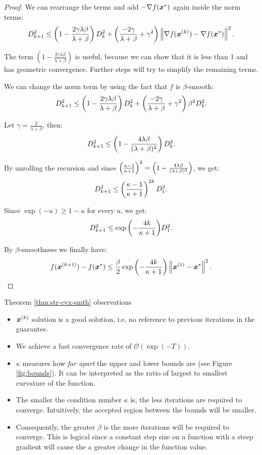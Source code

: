 \documentclass{article}
\begin{document}
{\begin{proof}
We can rearrange the terms and add $-\nabla f({\bm{x}}^\ast)$ again inside the norm terms:
\[
    D_{k+1}^2 \leq \left(1 - \frac{2\gamma \lambda \beta}{\lambda + \beta}\right) D^2_k + \left(\frac{-2\gamma}{\lambda + \beta} + \gamma^2\right) \left\|\nabla f({\bm{x}}^{(k)}) - \nabla f({\bm{x}}^\ast)\right\|^2.
\]

The term $\left(1-\frac{2\gamma \lambda \beta}{\lambda + \beta}\right)$ is useful, because we can show that it is less than 1 and has geometric convergence. Further steps will try to simplify the remaining terms.

We can change the norm term by using the fact that $f$ is $\beta$-smooth:
\[
    D_{k+1}^2 \leq \left(1 - \frac{2\gamma \lambda \beta}{\lambda + \beta}\right) D^2_k + \left(\frac{-2\gamma}{\lambda + \beta} + \gamma^2\right) \beta^2 D^2_k.
\]

Let $\gamma = \frac{2}{\lambda + \beta}$, then:
\[
    D^2_{k+1} \leq \left(1 - \frac{4 \lambda \beta}{(\lambda + \beta)^2}\right) D^2_k.
\]

By unrolling the recursion and since $\left(\frac{\kappa - 1}{\kappa + 1}\right)^2 = \left(1 - \frac{4 \lambda \beta}{(\lambda + \beta)^2}\right)$, we get:
\[
    D^2_{k+1} \leq \left(\frac{\kappa - 1}{\kappa + 1}\right)^{2k} D_1^2.
\]

Since $\exp(-u) \geq 1-u$ for every $u$, we get:
\[
    D_{k+1}^2 \leq \exp{\left(-\frac{4k}{\kappa + 1}\right)} D_1^2.
\]

By $\beta$-smoothness we finally have:
\[
    f({\bm{x}}^{(k+1)}) - f({\bm{x}}^\ast) \leq \frac{\beta}{2} \exp{\left(-\frac{4k}{\kappa + 1}\right)} \left\|{\bm{x}}^{(1)} - {\bm{x}}^\ast\right\|^2.
\]
\end{proof}

Theorem \ref{thm:str-cvx-smth} observations
\begin{itemize}
    \item ${\bm{x}}^{(k)}$ solution is a good solution, i.e. no reference to previous iterations in the guarantee.
    \item We achieve a fast convergence rate of $\mathcal{O}(\exp(-T))$.
    \item $\kappa$ measures how \emph{far apart} the upper and lower bounds are (see Figure \ref{fig:bounds}). 
    It can be interpreted as the ratio of largest to smallest curvature of the function.
    \item The smaller the condition number $\kappa$ is, the less iterations are required to converge. Intuitively, the accepted region between the bounds will be smaller.
    \item Consequently, the greater $\beta$ is the more iterations will be required to converge. This is logical since a constant step size on a function with a steep gradient will cause the a greater change in the function value.
\end{itemize}

}
\end{document}
